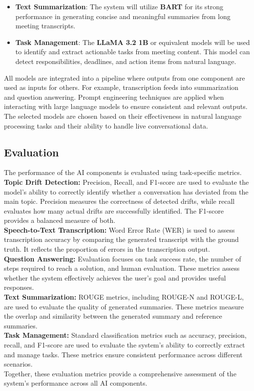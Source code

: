 {\begin{itemize}
        \item \textbf{Text Summarization}: The system will utilize \textbf{BART} for its strong performance in generating concise and meaningful summaries from long meeting transcripts.
        \item \textbf{Task Management}: The \textbf{LLaMA 3.2 1B} or equivalent models will be used to identify and extract actionable tasks from meeting content. This model can detect responsibilities, deadlines, and action items from natural language.
    \end{itemize}
    All models are integrated into a pipeline where outputs from one component are used as inputs for others.
    For example, transcription feeds into summarization and question answering.
    Prompt engineering techniques are applied when interacting with large language models to ensure consistent and relevant outputs.
    The selected models are chosen based on their effectiveness in natural language processing tasks and their ability to handle live conversational data.
}

\subsection{Evaluation}
{
    \setlength{\parindent}{2em}
    The performance of the AI components is evaluated using task-specific metrics.
    \\[1em]
    \textbf{Topic Drift Detection:} Precision, Recall, and F1-score are used to evaluate the model's ability to correctly identify whether a conversation has deviated from the main topic. Precision measures the correctness of detected drifts, while recall evaluates how many actual drifts are successfully identified. The F1-score provides a balanced measure of both.
    \\[1em]
    \textbf{Speech-to-Text Transcription:} Word Error Rate (WER) is used to assess transcription accuracy by comparing the generated transcript with the ground truth. It reflects the proportion of errors in the transcription output.
    \\[1em]
    \textbf{Question Answering:} Evaluation focuses on task success rate, the number of steps required to reach a solution, and human evaluation. These metrics assess whether the system effectively achieves the user's goal and provides useful responses.
    \\[1em]
    \textbf{Text Summarization:} ROUGE metrics, including ROUGE-N and ROUGE-L, are used to evaluate the quality of generated summaries. These metrics measure the overlap and similarity between the generated summary and reference summaries.
    \\[1em]
    \textbf{Task Management:} Standard classification metrics such as accuracy, precision, recall, and F1-score are used to evaluate the system's ability to correctly extract and manage tasks. These metrics ensure consistent performance across different scenarios.
    \\[1em]
    Together, these evaluation metrics provide a comprehensive assessment of the system's performance across all AI components.
}